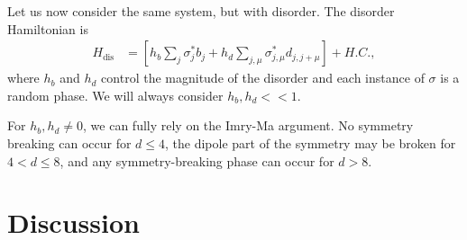 \documentclass[pra,aps,twocolumn, amsfonts,amsmath,amssymb,nofootinbib,superscriptaddress]{revtex4-2}
\providecommand{\DIFaddtex}[1]{{\protect\color{blue}\uwave{#1}}} %
\providecommand{\DIFdeltex}[1]{{\protect\color{red}\sout{#1}}}                      %
\providecommand{\DIFaddbegin}{} %
\providecommand{\DIFaddend}{} %
\providecommand{\DIFdelbegin}{} %
\providecommand{\DIFdelend}{} %
\providecommand{\DIFadd}[1]{\texorpdfstring{\DIFaddtex{#1}}{#1}} %
\providecommand{\DIFdel}[1]{\texorpdfstring{\DIFdeltex{#1}}{}} %
\newcommand{\DIFscaledelfig}{0.5}
\newlength{\DIFdelgraphicswidth} %
\newlength{\DIFdelgraphicsheight} %
\newcommand{\DIFaddincludegraphics}[2][]{{\color{blue}\fbox{\DIFOincludegraphics[#1]{#2}}}} %
\newcommand{\DIFdelincludegraphics}[2][]{%
\sbox{\DIFdelgraphicsbox}{\DIFOincludegraphics[#1]{#2}}%
\settoboxwidth{\DIFdelgraphicswidth}{\DIFdelgraphicsbox} %
\settoboxtotalheight{\DIFdelgraphicsheight}{\DIFdelgraphicsbox} %
\scalebox{\DIFscaledelfig}{%
\parbox[b]{\DIFdelgraphicswidth}{\usebox{\DIFdelgraphicsbox}\\[-\baselineskip] \rule{\DIFdelgraphicswidth}{0em}}\llap{\resizebox{\DIFdelgraphicswidth}{\DIFdelgraphicsheight}{%
\setlength{\unitlength}{\DIFdelgraphicswidth}%
\begin{picture}(1,1)%
\thicklines\linethickness{2pt} %
{\color[rgb]{1,0,0}\put(0,0){\framebox(1,1){}}}%
{\color[rgb]{1,0,0}\put(0,0){\line( 1,1){1}}}%
{\color[rgb]{1,0,0}\put(0,1){\line(1,-1){1}}}%
\end{picture}%
}\hspace*{3pt}}} %
} %
\DeclareRobustCommand{\DIFaddbegin}{\DIFOaddbegin \let\includegraphics\DIFaddincludegraphics} %
\DeclareRobustCommand{\DIFaddend}{\DIFOaddend \let\includegraphics\DIFOincludegraphics} %
\DeclareRobustCommand{\DIFdelbegin}{\DIFOdelbegin \let\includegraphics\DIFdelincludegraphics} %
\DeclareRobustCommand{\DIFdelend}{\DIFOaddend \let\includegraphics\DIFOincludegraphics} %
\begin{document}
Let us now consider the same system, but with disorder.  The disorder Hamiltonian is
\begin{align}
H_\text{dis} &= \left[h_b\sum_j \sigma^*_jb_j + h_d \sum_{j,\mu} \sigma^*_{j,\mu}d_{j,j+\mu}\right] + H.C.,
\end{align}
where $h_b$ and $h_d$ control the magnitude of the disorder and each instance of $\sigma$ is a random phase. We will always consider \DIFdelbegin \DIFdel{$h_b,h_d<<1$}\DIFdelend \DIFaddbegin \DIFadd{$h_b,h_d\ll1$}\DIFaddend .



For $h_b,h_d\ne 0$, we can fully rely on the Imry-Ma argument. No symmetry breaking can occur for $d\le 4$, the dipole part of the symmetry may be broken for $4<d\le 8$, and any symmetry-breaking phase can occur for $d>8$. 

\section{Discussion} \label{sec:disc}
\end{document}
